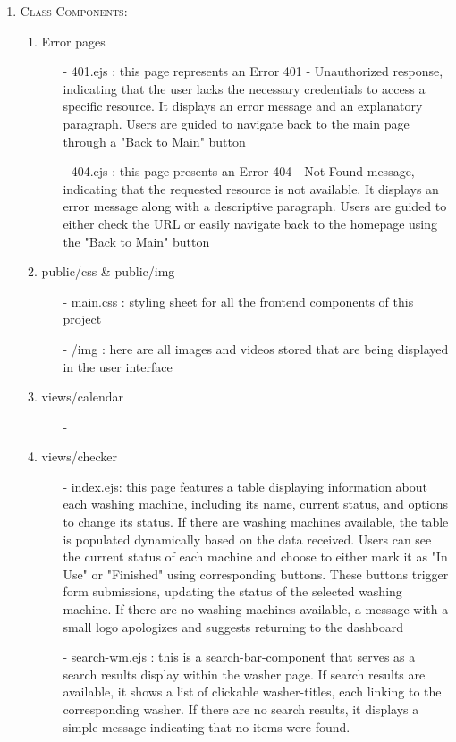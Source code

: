 \documentclass[conference]{IEEEtran}
\begin{document}
\begin{enumerate}
    \item \textsc{Class Components:} \begin{enumerate}
        \item Error pages
        \begin{itemize}
            \item[-] 401.ejs : this page represents an Error 401 - Unauthorized response, indicating that the user lacks the necessary credentials to access a specific resource. It displays an error message and an explanatory paragraph. Users are guided to navigate back to the main page through a "Back to Main" button
            \item[-] 404.ejs : this page presents an Error 404 - Not Found message, indicating that the requested resource is not available. It displays an error message along with a descriptive paragraph. Users are guided to either check the URL or easily navigate back to the homepage using the "Back to Main" button
        \end{itemize}
        
        \item public/css \& public/img
        \begin{itemize}
            \item[-] main.css : styling sheet for all the frontend components of this project
            \item[-] /img : here are all images and videos stored that are being displayed in the user interface
        \end{itemize}

        \item views/calendar
        \begin{itemize}
            \item[-]
        \end{itemize}

        \item views/checker
        \begin{itemize}
            \item[-] index.ejs: this page features a table displaying information about each washing machine, including its name, current status, and options to change its status. If there are washing machines available, the table is populated dynamically based on the data received. Users can see the current status of each machine and choose to either mark it as "In Use" or "Finished" using corresponding buttons. These buttons trigger form submissions, updating the status of the selected washing machine. If there are no washing machines available, a message with a small logo apologizes and suggests returning to the dashboard
            \item[-] search-wm.ejs : this is a search-bar-component that serves as a search results display within the washer page. If search results are available, it shows a list of clickable washer-titles, each linking to the corresponding washer. If there are no search results, it displays a simple message indicating that no items were found.
        \end{itemize}


\end{enumerate}
\end{enumerate}
\end{document}
